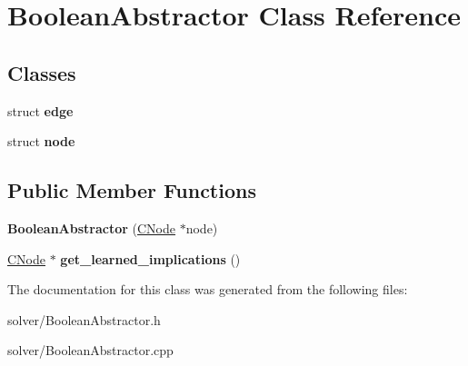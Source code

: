 \hypertarget{classBooleanAbstractor}{\section{\-Boolean\-Abstractor \-Class \-Reference}
\label{classBooleanAbstractor}
}
\subsection*{\-Classes}
\begin{DoxyCompactItemize}
\item 
struct {\bfseries edge}
\item 
struct {\bfseries node}
\end{DoxyCompactItemize}
\subsection*{\-Public \-Member \-Functions}
\begin{DoxyCompactItemize}
\item 
\hypertarget{classBooleanAbstractor_ad86f7d3759a8e153d98958fdcd380421}{{\bfseries \-Boolean\-Abstractor} (\hyperlink{classCNode}{\-C\-Node} $\ast$node)}\label{classBooleanAbstractor_ad86f7d3759a8e153d98958fdcd380421}

\item 
\hypertarget{classBooleanAbstractor_a69b8f15a807eee5998f058fb9234b5d4}{\hyperlink{classCNode}{\-C\-Node} $\ast$ {\bfseries get\-\_\-learned\-\_\-implications} ()}\label{classBooleanAbstractor_a69b8f15a807eee5998f058fb9234b5d4}

\end{DoxyCompactItemize}


\-The documentation for this class was generated from the following files\-:\begin{DoxyCompactItemize}
\item 
solver/\-Boolean\-Abstractor.\-h\item 
solver/\-Boolean\-Abstractor.\-cpp\end{DoxyCompactItemize}
